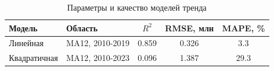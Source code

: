 \begin{table}[h!]
\centering
\caption{Параметры и качество моделей тренда}
\label{tab:trend}
\begin{tabular}{llccc}
\toprule
Модель & Область & $R^2$ & RMSE, млн & MAPE, \% \\
\midrule
Линейная & MA12, 2010-2019 & 0.859 & 0.326 & 3.3 \\
Квадратичная & MA12, 2010-2023 & 0.096 & 1.387 & 29.3 \\
\bottomrule
\end{tabular}
\end{table}

